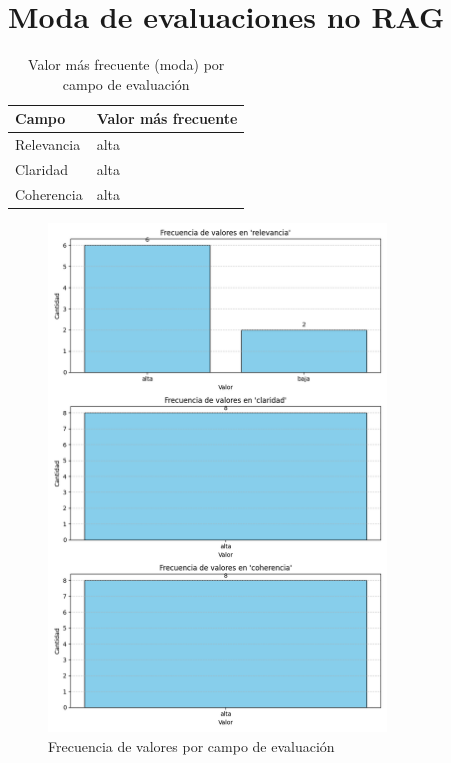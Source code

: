 \documentclass{article}
\begin{document}
\section*{Moda de evaluaciones no RAG}

\begin{table}[H]
\centering
\caption{Valor más frecuente (moda) por campo de evaluación}
\begin{tabularx}{0.6\textwidth}{lX}
\toprule
\textbf{Campo} & \textbf{Valor más frecuente} \\
\midrule
Relevancia & alta \\
Claridad & alta \\
Coherencia & alta \\
\bottomrule
\end{tabularx}
\end{table}

\begin{figure}[H]
\centering
\includegraphics[width=0.8\textwidth]{../graficos/no_rag_frecuencias.png}
\caption{Frecuencia de valores por campo de evaluación}
\end{figure}
\end{document}
